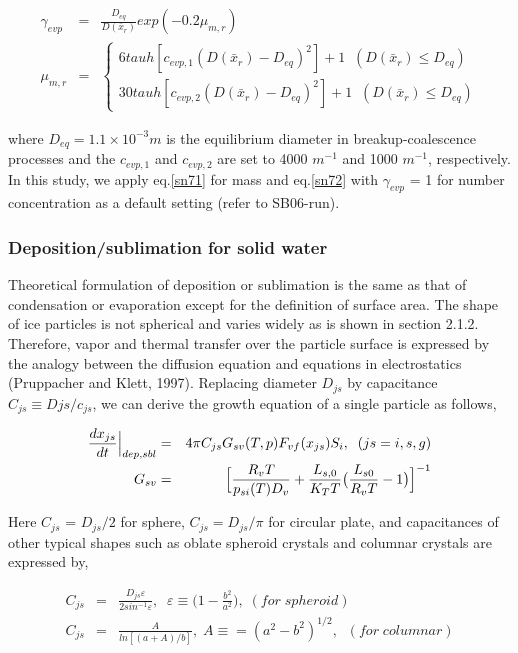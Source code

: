 \begin{eqnarray}
\gamma_{evp}&=&\frac{D_{eq}}{D(\bar{x}_{r})}exp(-0.2\mu_{m,r})\label{sn73}\\
\mu_{m,r}&=&
\left\{
\begin{array}{l}
6tauh[{c_{evp,1}(D(\bar{x}_{r})-D_{eq})}^{2}]+1\;\;(D(\bar{x}_{r})\leq D_{eq}) \\
30tauh[{c_{evp,2}(D(\bar{x}_{r})-D_{eq})}^{2}]+1\;\;(D(\bar{x}_{r})\leq D_{eq})
\label{sn74}
\end{array}
\right.
\end{eqnarray}

where $D_{eq} = 1.1 \times 10^{-3} m$ is the equilibrium diameter in breakup-coalescence processes and the $c_{evp,1}$ and $c_{evp,2}$ are set to 4000 $m^{-1}$ and 1000 $m^{-1}$, respectively. In this study, we apply eq.\ref{sn71} for mass and eq.\ref{sn72} with $\gamma_{evp}$ = 1 for number concentration as a default setting (refer to SB06-run).

\subsubsection{Deposition/sublimation for solid water}
Theoretical formulation of deposition or sublimation is the same as that of condensation or evaporation except for the definition of surface area. The shape of ice particles is not spherical and varies widely as is shown in section 2.1.2. Therefore, vapor and thermal transfer over the particle surface is expressed by the analogy between the diffusion equation and equations in electrostatics (Pruppacher and Klett, 1997). Replacing diameter $D_{js}$ by capacitance $C_{js}\equiv D{js}/c_{js}$, we can derive the growth equation of a single particle as follows,

\begin{eqnarray}
\frac{dx_{js}}{dt}\Bigr|_{dep,sbl}&=&4\pi C_{js}G_{sv}(T,p)F_{vf}(x_{js})S_{i},\;\;(js=i,s,g)\label{sn75}\\
G_{sv}&=&\Bigl[\frac{R_{v}T}{p_{si}(T)D_{v}}+\frac{L_{s,0}}{K_{T}T}\bigl(\frac{L_{s0}}{R_{v}T}-1\bigr)\Bigr]^{-1}\label{sn76}
\end{eqnarray}

Here $C_{js}$ = $D_{js}/2$ for sphere, $C_{js} = D_{js}/\pi$ for circular plate, and capacitances of other typical shapes such as oblate spheroid crystals and columnar crystals are expressed by,

\begin{eqnarray}
C_{js}&=&\frac{D_{js}\varepsilon}{2sin^{-1}\varepsilon},\;\;\varepsilon\equiv\bigl(1-\frac{b^{2}}{a^{2}}\bigr), \;(for\;spheroid)\label{sn77}\\
C_{js}&=&\frac{A}{ln[(a+A)/b]},\;A\equiv=(a^{2}-b^{2})^{1/2},\;\;(for\;columnar)
\end{eqnarray}

